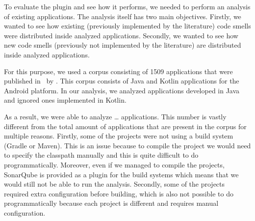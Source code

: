 
To evaluate the plugin and see how it performs, we needed to perform an analysis of existing applications.
The analysis itself has two main objectives.
Firstly, we wanted to see how existing (previously implemented by the literature) code smells were distributed
inside analyzed applications.
Secondly, we wanted to see how new code smells (previously not implemented by the literature) are distributed
inside analyzed applications.


For this purpose, we used a corpus consisting of 1509 applications that were published in~\cite{kotlin_android_corpus} by
\citeauthor{kotlin_android_corpus}.
This corpus consists of Java and Kotlin applications for the Android platform.
In our analysis, we analyzed applications developed in Java and ignored ones implemented in Kotlin.


As a result, we were able to analyze {\ldots} applications.
This number is vastly different from the total amount of applications that are present in the corpus for multiple reasons.
Firstly, some of the projects were not using a build system (Gradle or Maven).
This is an issue because to compile the project we would need to specify the classpath manually and
this is quite difficult to do programmatically.
Moreover, even if we managed to compile the projects, SonarQube is provided as a plugin for the build systems which means
that we would still not be able to run the analysis.
Secondly, some of the projects required extra configuration before building, which is also not possible to do
programmatically because each project is different and requires manual configuration.
